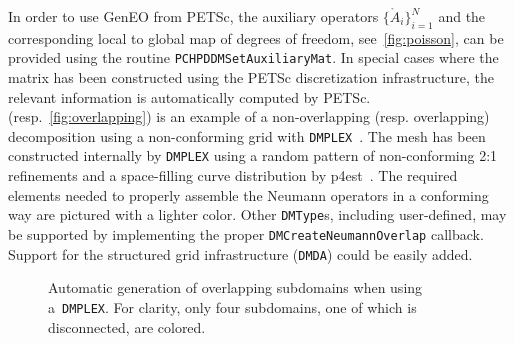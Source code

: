 \documentclass[3p,11pt]{elsarticle}
\newcommand{\pk}[1]{\texttt{#1}}
\begin{document}
In order to use GenEO from PETSc, the auxiliary operators $\{\mathring{A}_i\}_{i=1}^N$
and the corresponding local to global map of degrees of freedom, see~\cref{fig:poisson},
can be provided using the routine \pk{PCHPDDMSetAuxiliaryMat}.
In special cases where the matrix has been constructed using the PETSc discretization
infrastructure, the relevant information is automatically computed
by PETSc.  (resp.~\cref{fig:overlapping}) is an
example of a non-overlapping (resp. overlapping) decomposition using a
non-conforming grid with \pk{DMPLEX}~\cite{knepley2009mesh}. The
mesh has been constructed internally by \pk{DMPLEX} using a random pattern of non-conforming 2:1 refinements
and a space-filling curve distribution by p4est~\cite{BursteddeWilcoxGhattas11}.
The required elements needed to properly assemble the Neumann operators in a conforming way are pictured with a lighter color.
Other \pk{DMType}s, including user-defined, may be supported by
implementing the proper \pk{DMCreateNeumannOverlap} callback. Support for the
structured grid infrastructure (\pk{DMDA}) could be easily added.
\begin{figure}[htbp]
  \centering
    \caption{Automatic generation of overlapping subdomains when using a~\pk{DMPLEX}. For clarity, only four subdomains, one of which is disconnected, are colored.\label{fig:p4est}}
\end{figure}
\end{document}
